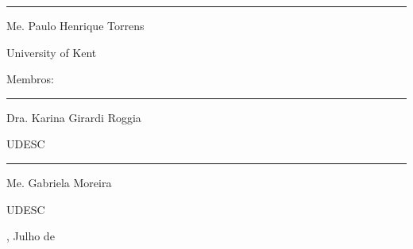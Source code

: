 \begin{folhadeaprovacao}
	\begin{center}
		\begin{minipage}{8.75cm}
			\begin{flushleft}
				\rule{8.75cm}{0.1mm}

				Me. Paulo Henrique Torrens \par
				University of Kent
			\end{flushleft}
		\end{minipage}
	\end{center}

	\vspace*{\baselineskip}
	{Membros:}

	\begin{center}
		\begin{minipage}{8.75cm}
			\begin{flushleft}
				\rule{8.75cm}{0.1mm}

				Dra. Karina Girardi Roggia \par
				UDESC

				\vspace*{1cm}
				\rule{8.75cm}{0.1mm}

				Me. Gabriela Moreira \par
				UDESC
			\end{flushleft}
		\end{minipage}
	\end{center}

	\vspace*{\fill}
	\begin{center}
		{\imprimirlocal, Julho de \imprimirdata}
	\end{center}
	\vspace*{0.25cm}
\end{folhadeaprovacao}




